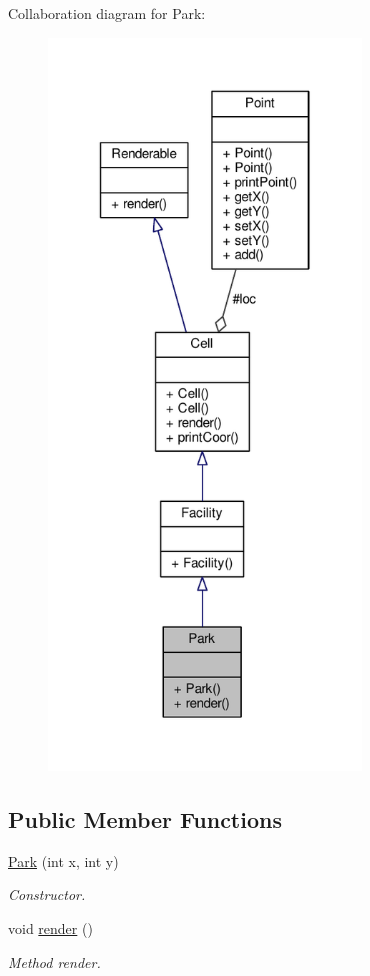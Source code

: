 Collaboration diagram for Park\+:
\nopagebreak
\begin{figure}[H]
\begin{center}
\leavevmode
\includegraphics[height=550pt]{classPark__coll__graph}
\end{center}
\end{figure}
\subsection*{Public Member Functions}
\begin{DoxyCompactItemize}
\item 
\hyperlink{classPark_a2d682e911b7209d46ddabbf3d7cd2165}{Park} (int x, int y)
\begin{DoxyCompactList}\small\item\em Constructor. \end{DoxyCompactList}\item 
void \hyperlink{classPark_afd7fe6ec511aab1b2451096b54c3addd}{render} ()\hypertarget{classPark_afd7fe6ec511aab1b2451096b54c3addd}{}\label{classPark_afd7fe6ec511aab1b2451096b54c3addd}

\begin{DoxyCompactList}\small\item\em Method render. \end{DoxyCompactList}\end{DoxyCompactItemize}

